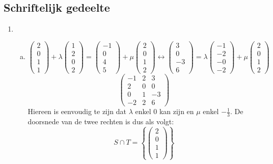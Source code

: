 \documentclass[main.tex]{subfiles}
\begin{document}
\subsection{Schriftelijk gedeelte}
\begin{enumerate}
\item
  \begin{enumerate}[(a)]
  \item 
    \[
    \begin{pmatrix}
      2\\0\\1\\1
    \end{pmatrix}
    + \lambda
    \begin{pmatrix}
      1\\2\\0\\2
    \end{pmatrix}
    =
    \begin{pmatrix}
      -1\\0\\4\\5
    \end{pmatrix}
    + \mu
    \begin{pmatrix}
      2\\0\\1\\2
    \end{pmatrix}
    \longleftrightarrow
    \begin{pmatrix}
      3\\0\\-3\\6
    \end{pmatrix}
    =
    \lambda
    \begin{pmatrix}
      -1\\-2\\-0\\-2
    \end{pmatrix}
    + \mu
    \begin{pmatrix}
      2\\0\\1\\2
    \end{pmatrix}
    \]
    \[
    \left(
      \begin{array}{cc|c}
        -1 & 2 & 3\\
        2 & 0 & 0\\
        0 & 1 & -3\\
        -2 & 2 & 6
      \end{array}
    \right)
    \]
    Hiereen is eenvoudig te zijn dat $\lambda$ enkel $0$ kan zijn en $\mu$ enkel $-\frac{1}{3}$.
    De doorsnede van de twee rechten is dus als volgt:
    \[
    S \cap T =
    \left\{
      \begin{pmatrix}
        2 \\0\\1\\1
      \end{pmatrix}
    \right\}
    \]
  \end{enumerate}


\end{enumerate}
\end{document}
